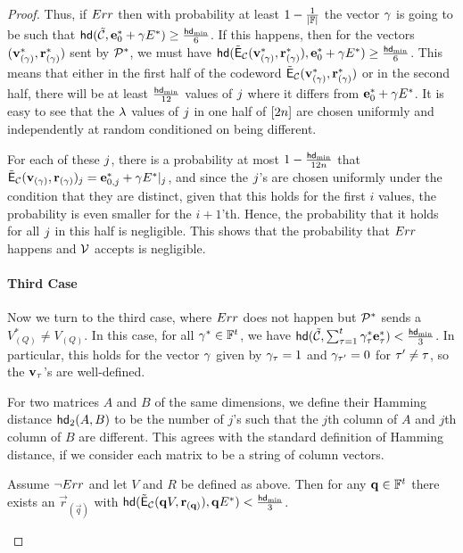 \begin{proof}
Thus, if $ Err$ then with probability at least $1-\frac{1}{|\mathbb{F}|}$ the vector ${\mathbf{\gamma}}$ is going to be such that $\mathsf{hd}(\tilde{\mathcal{C}},\mathbf{e}^*_0+\mathbf{\gamma} E^*)\geq \frac{\mathsf{hd}_{\mathrm{min}}}{6}$. If this happens, then for the vectors $({\mathbf{v}}_{({\mathbf{\gamma}})}^*,\mathbf{r}_{({\mathbf{\gamma}})}^*)$ sent by $\mathcal{P}^*$, we must have $\mathsf{hd}(\tilde{\mathsf{E}}_{\mathcal{C}}({\mathbf{v}}_{({\mathbf{\gamma}})}^*,\mathbf{r}_{({\mathbf{\gamma}})}^*),\mathbf{e}^*_0+{\mathbf{\gamma}} E^*)\geq \frac{\mathsf{hd}_{\mathrm{min}}}{6}$. This means that either in the first half of the codeword $\tilde{\mathsf{E}}_{\mathcal{C}}({\mathbf{v}}_{({\mathbf{\gamma}})}^*,\mathbf{r}_{({\mathbf{\gamma}})}^*)$ or in the second half, there will be at least $\frac{\mathsf{hd}_{\mathrm{min}}}{12}$ values of $j$ where it differs from $\mathbf{e}^*_0+{\mathbf{\gamma}} E^*$. It is easy to see that the $\lambda$ values of $j$ in one half of $[2n]$ are chosen uniformly and independently at random conditioned on being different.


For each of these $j$, there is a probability at most $1-\frac{\mathsf{hd}_{\mathrm{min}}}{12n}$ that $\tilde{\mathsf{E}}_{\mathcal{C}}({\mathbf{v}}_{({\mathbf{\gamma}})},\mathbf{r}_{({\mathbf{\gamma}})})_j= \mathbf{e}^*_{0,j}+{\mathbf{\gamma}} E^*|_j$, and since the $j$'s are chosen uniformly under the condition that they are distinct, given that this holds for the first $i$ values, the probability is even smaller for the $i+1$'th. Hence, the probability that it holds for all $j$ in this half is negligible. This shows that the probability that $Err$ happens and $\mathcal{V}$ accepts is negligible. %

\paragraph{Third Case} Now we turn to the third case, where $Err$ does not happen but $\mathcal{P}^*$ sends a $V_{(Q)}^*\neq V_{(Q)}$.
In this case, for all ${\mathbf{\gamma}}^*\in \mathbb{F}^{{t_{}}}$, we have $\mathsf{hd}(\tilde{\mathcal{C}}, \sum^t_{\tau=1}{\mathbf{\gamma}}^*_\tau\mathbf{e}^*_\tau)< \frac{\mathsf{hd}_{\mathrm{min}}}{3}$. In particular, this holds for the vector ${\mathbf{\gamma}}$ given by ${\mathbf{\gamma}}_\tau=1$ and ${\mathbf{\gamma}}_{\tau'}=0$ for $\tau'\neq \tau$, so the ${\mathbf{v}}_\tau$'s are well-defined. 

For two matrices $A$ and $B$ of the same dimensions, we define their Hamming distance $\mathsf{hd}_2(A,B)$ to be the number of $j$'s such that the $j$th column of $A$ and $j$th column of $B$ are different. This agrees with the standard definition of Hamming distance, if we consider each matrix to be a string of column vectors.

\begin{lemma}
Assume $\neg Err$ and let $V$ and $R$ be defined as above. 
Then for any $\mathbf{q}\in \mathbb{F}^{{t_{}}}$ there exists an $\vec{r}_{(\vec{q})}$ with $\mathsf{hd}(\tilde{\mathsf{E}}_{\mathcal{C}}(\mathbf{q} V, \mathbf{r}_{(\mathbf{q})}), \mathbf{q} E^*)< \frac{\mathsf{hd}_{\mathrm{min}}}{3}$. 


\end{lemma}
\end{proof}
